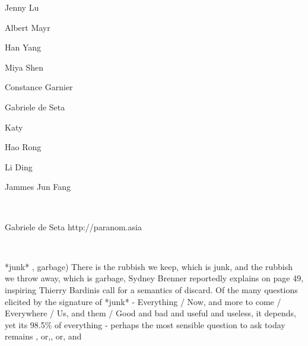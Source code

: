 Jenny Lu 

Albert Mayr

Han Yang 

Miya Shen 

Constance Garnier 

Gabriele de Seta

Katy

Hao Rong

Li Ding

Jammes Jun Fang

~


\bigskip


\bigskip

Gabriele de Seta\newline
http://paranom.asia

\newline
\textstyleStrongEmphasis{*[6570?]*[5A92?]*[5E9F?]*[54C1?]*[4FD7?]*}\newline
{}

~

*junk*\newline
{}, garbage)\newline
{\textquotedbl}There is the rubbish we keep, which is junk, and the
rubbish we throw away, which is garbage{\textquotedbl}, Sydney Brenner
reportedly explains on page 49, inspiring Thierry
Bardini{\textquotesingle}s call for a semantics of discard. Of the many
questions elicited by the signature of *junk* -  Everything /  Now, and more
to come /  Everywhere /
Us, and them /  Good and bad and useful and useless, it depends, yet
it{\textquotesingle}s 98.5\% of everything - perhaps the most sensible
question to ask today remains ,
or,, or,  and 

